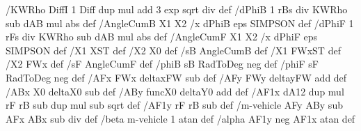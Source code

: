{{/KWRho {DiffI 1 Diff dup mul add 3 exp sqrt div} def
/dPhiB {1 rBs div KWRho sub dAB mul abs} def
/AngleCumB { %
 X1 X2 /x {dPhiB} eps SIMPSON
 } def
 /dPhiF {1 rFs div KWRho sub dAB mul abs} def
/AngleCumF { %
 X1 X2 /x {dPhiF} eps SIMPSON
 } def
/X1 XST def /X2 X0 def %
/sB AngleCumB def %
/X1 FWxST def /X2 FWx def
/sF AngleCumF def %
/phiB sB RadToDeg neg def
/phiF sF RadToDeg neg def
/AFx FWx deltaxFW sub def %
/AFy FWy deltayFW add def %
/ABx X0 deltaX0 sub def %
/ABy funcX0 deltaY0 add def %
/AF1x dA12 dup mul rF rB sub dup mul sub sqrt def
/AF1y rF rB sub def
/m-vehicle AFy ABy sub AFx ABx sub div def
/beta m-vehicle 1 atan def %
/alpha AF1y neg AF1x atan def %
}}
